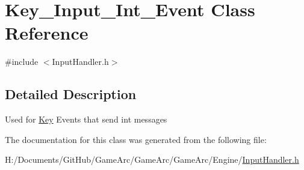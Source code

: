 \hypertarget{class_key___input___int___event}{\section{Key\+\_\+\+Input\+\_\+\+Int\+\_\+\+Event Class Reference}
\label{class_key___input___int___event}
}


{\ttfamily \#include $<$Input\+Handler.\+h$>$}



\subsection{Detailed Description}
Used for \hyperlink{class_key}{Key} Events that send int messages 

The documentation for this class was generated from the following file\+:\begin{DoxyCompactItemize}
\item 
H\+:/\+Documents/\+Git\+Hub/\+Game\+Arc/\+Game\+Arc/\+Game\+Arc/\+Engine/\hyperlink{_input_handler_8h}{Input\+Handler.\+h}\end{DoxyCompactItemize}
